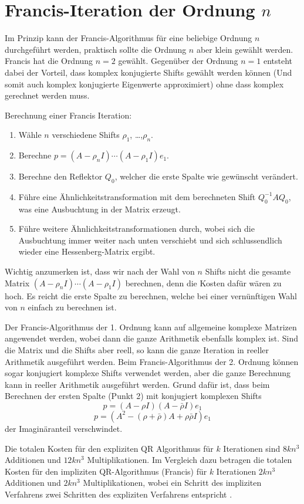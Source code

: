 \section{Francis-Iteration der Ordnung $n$}
%
Im Prinzip kann der Francis-Algorithmus für eine beliebige Ordnung $n$ durchgeführt werden, praktisch sollte die Ordnung $n$ aber klein gewählt werden.
Francis hat die Ordnung $n=2$ gewählt.
Gegenüber der Ordnung $n=1$ entsteht dabei der Vorteil, dass komplex konjugierte Shifts gewählt werden können (Und somit auch komplex konjugierte Eigenwerte approximiert) ohne dass komplex gerechnet werden muss.

Berechnung einer Francis Iteration:
\begin{enumerate}
	\item Wähle $n$ verschiedene Shifts $\rho_{1}$, \dots ,$\rho_{n}$.
	\item Berechne $p= (A - \rho_{n}I) \cdots (A - \rho_{1}I)e_{1}$.
	\item Berechne den Reflektor $Q_{0}$, welcher die erste Spalte wie gewünscht verändert.
	\item Führe eine Ähnlichkeitstransformation mit dem berechneten Shift $Q_{0}^{-1}AQ_{0}$, was eine Ausbuchtung in der Matrix erzeugt.
	\item Führe weitere Ähnlichkeitstransformationen durch, wobei sich die Ausbuchtung immer weiter nach unten verschiebt und sich schlussendlich wieder eine Hessenberg-Matrix ergibt.
\end{enumerate}

Wichtig anzumerken ist, dass wir nach der Wahl von $n$ Shifts nicht die gesamte Matrix $(A - \rho_{n}I) \cdots (A - \rho_{1}I)$ berechnen, denn die Kosten dafür wären zu hoch. Es reicht die erste Spalte zu berechnen, welche bei einer vernünftigen Wahl von $n$ einfach zu berechnen ist.

Der Francis-Algorithmus der 1. Ordnung kann auf allgemeine komplexe Matrizen angewendet werden, wobei dann die ganze Arithmetik ebenfalls komplex ist.
Sind die Matrix und die Shifts aber reell, so kann die ganze Iteration in reeller Arithmetik ausgeführt werden.
Beim Francis-Algorithmus der 2. Ordnung können sogar konjugiert komplexe Shifts verwendet werden, aber die ganze Berechnung kann in reeller Arithmetik ausgeführt werden. Grund dafür ist, dass beim Berechnen der ersten Spalte (Punkt 2) mit konjugiert komplexen Shifts
\begin{equation}
p= (A - \rho I)(A - \bar{\rho} I)e_{1}
\end{equation}
\begin{equation}
p= (A^2-(\rho+\bar{\rho})A+\rho\bar{\rho}I)e_{1}
\end{equation}
der Imaginäranteil verschwindet.

Die totalen Kosten für den expliziten QR Algorithmus für $k$ Iterationen sind $8kn^{3}$ Additionen und $12kn^{3}$ Multiplikationen.
Im Vergleich dazu betragen die totalen Kosten für den impliziten QR-Algorithmus (Francis) für $k$ Iterationen $2kn^{3}$ Additionen und $2kn^{3}$ Multiplikationen, wobei ein Schritt des impliziten Verfahrens zwei Schritten des expliziten Verfahrens entspricht \cite{francis:EthSeminar}.
